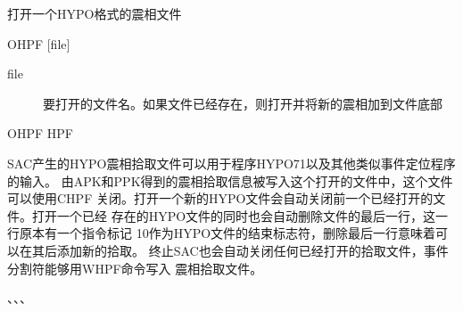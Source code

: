 \label{cmd:ohpf}

打开一个HYPO格式的震相文件

\begin{SACSTX}
OHPF [file]
\end{SACSTX}

\begin{description}
\item [file]  要打开的文件名。如果文件已经存在，则打开并将新的震相加到文件底部
\end{description}

\begin{SACDFT}
OHPF HPF
\end{SACDFT}

SAC产生的HYPO震相拾取文件可以用于程序HYPO71以及其他类似事件定位程序的输入。
由APK和PPK得到的震相拾取信息被写入这个打开的文件中，这个文件可以使用CHPF
关闭。打开一个新的HYPO文件会自动关闭前一个已经打开的文件。打开一个已经
存在的HYPO文件的同时也会自动删除文件的最后一行，这一行原本有一个指令标记
10作为HYPO文件的结束标志符，删除最后一行意味着可以在其后添加新的拾取。
终止SAC也会自动关闭任何已经打开的拾取文件，事件分割符能够用WHPF命令写入
震相拾取文件。

、、、
